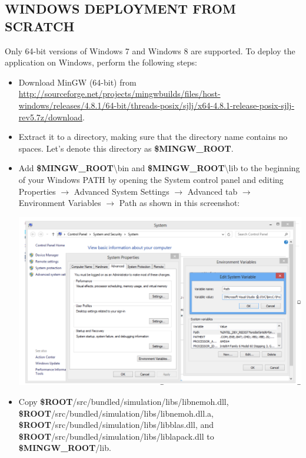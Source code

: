 \documentclass[12pt]{article}
\newcommand{\ROOT}{{\textbf{\$ROOT}}}
\newcommand{\MINGWROOT}{{\textbf{\$MINGW{\_}ROOT}}}
\begin{document}
\subsection{WINDOWS DEPLOYMENT FROM SCRATCH}
\label{ws}

Only 64-bit versions of Windows 7 and Windows 8 are supported.
To deploy the application on Windows, perform the following steps:

\begin{itemize}
	\item Download MinGW (64-bit) from \url{http://sourceforge.net/projects/mingwbuilds/files/host-windows/releases/4.8.1/64-bit/threads-posix/sjlj/x64-4.8.1-release-posix-sjlj-rev5.7z/download}.
	
	\item Extract it to a directory, making sure that the directory name contains no spaces. Let's denote this directory as \MINGWROOT.
	
	\item Add \MINGWROOT{}\textbackslash{}bin and \MINGWROOT{}\textbackslash{}lib to the beginning of your Windows PATH by opening the System control panel and editing Properties $\rightarrow$ Advanced System Settings  $\rightarrow$ Advanced tab  $\rightarrow$ Environment Variables  $\rightarrow$ Path as shown in this screenshot:
	
	\vspace{\abovedisplayskip}
	\begin{minipage}{\linewidth}
		\centering
		\includegraphics[scale=0.75]{img/1}
	\end{minipage}
	\vspace{\belowdisplayskip}
	
	\item Copy \ROOT{}/src/bundled/simulation/libs/libnemoh.dll,  \ROOT{}/src/bundled/simulation/libs/libnemoh.dll.a, \\
	 \ROOT{}/src/bundled/simulation/libs/libblas.dll, and
	  \ROOT{}/src/bundled/simulation/libs/liblapack.dll to \MINGWROOT{}/lib.
	

\end{itemize}
\end{document}
